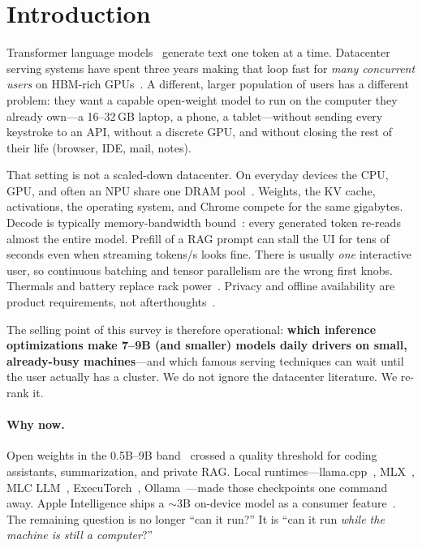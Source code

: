 \section{Introduction}
\label{sec:intro}

Transformer language models~\citep{vaswani2017attention,brown2020gpt3} generate text one token at a time. Datacenter serving systems have spent three years making that loop fast for \emph{many concurrent users} on HBM-rich GPUs~\citep{kwon2023vllm,yu2022orca,agrawal2024sarathi}. A different, larger population of users has a different problem: they want a capable open-weight model to run on the computer they already own---a 16--32\,GB laptop, a phone, a tablet---without sending every keystroke to an API, without a discrete GPU, and without closing the rest of their life (browser, IDE, mail, notes).

That setting is not a scaled-down datacenter. On everyday devices the CPU, GPU, and often an NPU share one DRAM pool~\citep{apple2020silicon,mlx2023}. Weights, the KV cache, activations, the operating system, and Chrome compete for the same gigabytes. Decode is typically memory-bandwidth bound~\citep{williams2009roofline,pope2022efficiently}: every generated token re-reads almost the entire model. Prefill of a RAG prompt can stall the UI for tens of seconds even when streaming tokens/s looks fine. There is usually \emph{one} interactive user, so continuous batching and tensor parallelism are the wrong first knobs. Thermals and battery replace rack power~\citep{luccioni2024power}. Privacy and offline availability are product requirements, not afterthoughts~\citep{bommasani2021foundation,chen2024personal,gunter2024apple}.

The selling point of this survey is therefore operational: \textbf{which inference optimizations make 7--9B (and smaller) models daily drivers on small, already-busy machines}---and which famous serving techniques can wait until the user actually has a cluster. We do not ignore the datacenter literature. We re-rank it.

\paragraph{Why now.}
Open weights in the 0.5B--9B band~\citep{dubey2024llama3,jiang2024mixtral,mistral2023,yang2024qwen2,team2024gemma2,abdin2024phi3,zhang2024tinyllama} crossed a quality threshold for coding assistants, summarization, and private RAG. Local runtimes---llama.cpp~\citep{llamacpp}, MLX~\citep{mlx2023,mlxlm2023}, MLC LLM~\citep{mlcllm}, ExecuTorch~\citep{executorch}, Ollama~\citep{ollama}---made those checkpoints one command away. Apple Intelligence ships a $\sim$3B on-device model as a consumer feature~\citep{gunter2024apple}. The remaining question is no longer ``can it run?'' It is ``can it run \emph{while the machine is still a computer}?''

